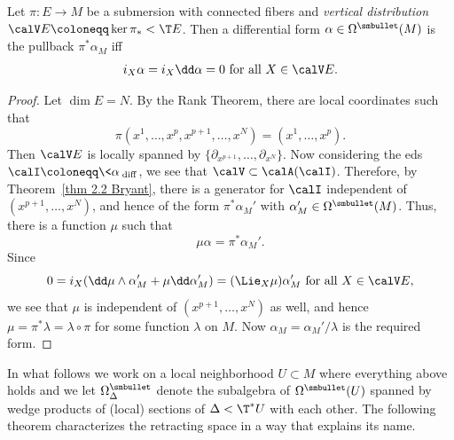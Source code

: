 \begin{cor}
    Let $\pi:E\to M$ be a submersion with connected fibers and \emph{vertical distribution} $\calV E\coloneqq \ker\pi_{\ast}<\T E$. Then a differential form $\alpha\in\Omega^{\smbullet}(M)$ is the pullback $\pi^\ast \alpha_M$ iff 
    \[i_X\alpha=i_X\dd\alpha=0\text{ for all }X\in \calV E.\]
\end{cor}
\begin{proof}
    Let $\dim E=N$. By the Rank Theorem, there are local coordinates such that 
    \[\pi(x^1,\ldots,x^p,x^{p+1},\ldots,x^N)=(x^1,\ldots,x^p).\]
    Then $\calV E$ is locally spanned by $\{\partial_{x^{p+1}},\ldots,\partial_{x^N}\}$. Now considering the \gls{eds} $\calI\coloneqq \<\alpha\>_{\mathrm{diff}}$, we see that $\calV\subset\calA(\calI)$. Therefore, by Theorem~\ref{thm 2.2 Bryant}, there is a generator for $\calI$ independent of $(x^{p+1},\ldots,x^N)$, and hence of the form $\pi^\ast \alpha_M'$ with $\alpha_M'\in \Omega^{\smbullet}(M)$. Thus, there is a function $\mu$ such that 
    \[\mu\alpha=\pi^\ast \alpha_M'.\]
    Since 
    \[0=i_X(\dd \mu\wedge\alpha_M'+\mu\dd\alpha_M')=(\Lie_X \mu)\alpha_M'\text{ for all }X\in\calV E,\]
    we see that $\mu$ is independent of $(x^{p+1},\ldots,x^N)$ as well, and hence $\mu=\pi^\ast\lambda=\lambda\circ \pi$ for some function $\lambda$ on $M$. Now $\alpha_M=\alpha_M'/\lambda$ is the required form.
\end{proof}

In what follows we work on a local neighborhood $U\subset M$ where everything above holds and we let $\Omega^{\smbullet}_\Delta$ denote the subalgebra of $\Omega^{\smbullet}(U)$ spanned by wedge products of (local) sections of $\Delta<\T^\ast U$ with each other. The following theorem characterizes the retracting space in a way that explains its name.

